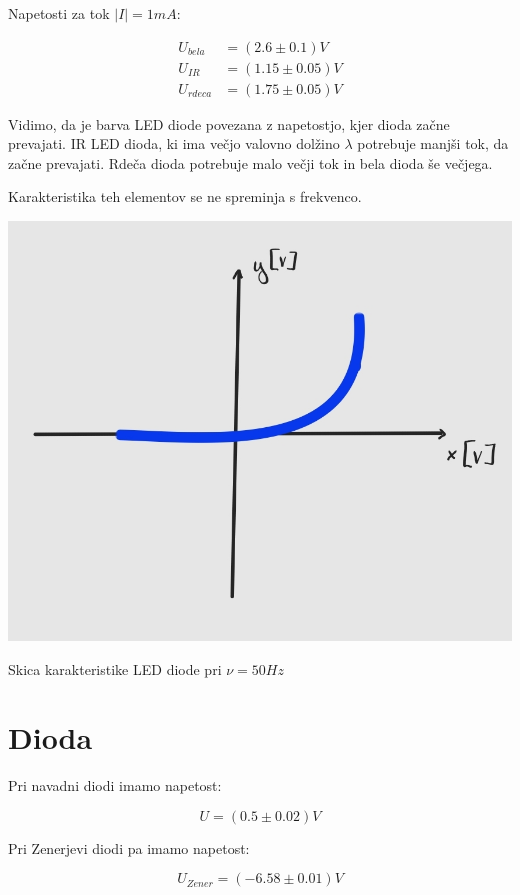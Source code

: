 \documentclass[12pt]{report}
\begin{document}
Napetosti za tok $|I| = 1\si{mA}$:

\begin{align*}
  U_{bela} &= (2.6 \pm 0.1)\si{V} \\
  U_{IR} &= (1.15 \pm 0.05)\si{V} \\ 
  U_{rdeca} &= (1.75 \pm 0.05)\si{V}
\end{align*}

Vidimo, da je barva LED diode povezana z napetostjo, kjer dioda začne prevajati. IR LED dioda, ki ima večjo valovno dolžino $\lambda$ potrebuje manjši tok, da začne prevajati. Rdeča dioda potrebuje malo večji tok in bela dioda še večjega.

Karakteristika teh elementov se ne spreminja s frekvenco. 

\begin{slika}[H]
  \centering
  \includegraphics{LED}
  \caption{\small Skica karakteristike LED diode pri $\nu = 50\si{Hz}$}
\end{slika}

\section*{Dioda}

Pri navadni diodi imamo napetost:

\[
  U = (0.5 \pm 0.02)\si{V}  
\]

Pri Zenerjevi diodi pa imamo napetost:

\[
  U_{Zener} = (-6.58 \pm 0.01)\si{V}  
\]
\end{document}
